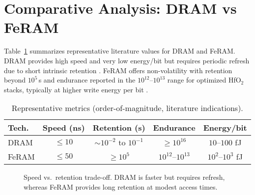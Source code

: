 \section{Comparative Analysis: DRAM vs FeRAM}
\label{sec:comparison}

Table~\ref{tab:comparison} summarizes representative literature values for DRAM and FeRAM. DRAM provides high speed and very low energy/bit but requires periodic refresh due to short intrinsic retention \cite{choi2022,kim2021_dram,iedm2023_dram}. FeRAM offers non-volatility with retention beyond $10^{5}$\,s and endurance reported in the $10^{12}$--$10^{13}$ range for optimized HfO$_2$ stacks, typically at higher write energy per bit \cite{boscke2011,mueller2012,noheda2023,martin2020}.

\begin{table}[!t]
\centering
\caption{Representative metrics (order-of-magnitude, literature indications).}
\label{tab:comparison}
\scriptsize
\begin{tabular}{lcccc}
\toprule
Tech. & Speed (ns) & Retention (s) & Endurance & Energy/bit \\
\midrule
DRAM  & $\le 10$  & $\sim 10^{-2}$ to $10^{-1}$ & $\ge 10^{16}$ & $10$--$100$ fJ \\
FeRAM & $\le 50$  & $\ge 10^{5}$                & $10^{12}$--$10^{13}$ & $10^{2}$--$10^{3}$ fJ \\
\bottomrule
\end{tabular}
\end{table}

\begin{figure}[!t]
\centering
{}
\caption{Speed vs.\ retention trade-off. DRAM is faster but requires refresh, whereas FeRAM provides long retention at modest access times.}
\label{fig:speed_retention}
\end{figure}

